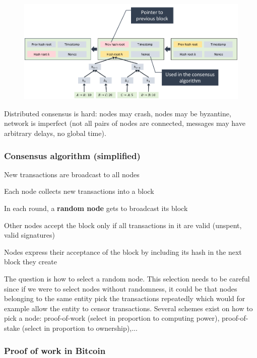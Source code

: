 \documentclass[11pt,oneside,a4paper]{article}
\begin{document}
\begin{figure}[t!]
	\centering
	\includegraphics[width=0.6\linewidth]{figures/bitcoin_blocks}
	\label{fig:bitcoinblocks}
\end{figure}

Distributed consensus is hard: nodes may crash, nodes may be byzantine, network is imperfect (not all pairs of nodes are connected, messages may have arbitrary delays, no global time).\\

\subsubsection{Consensus algorithm (simplified)}

\begin{compactenum}
	\item New transactions are broadcast to all nodes
	\item Each node collects new transactions into a block
	\item In each round, a \textbf{random node} gets to broadcast its block
	\item Other nodes accept the block only if all transactions in it are valid (unspent, valid signatures)
	\item Nodes express their acceptance of the block by including its hash in the next block they create\\
\end{compactenum}

The question is how to select a random node. This selection needs to be careful since if we were to select nodes without randomness, it could be that nodes belonging to the same entity pick the transactions repeatedly which would for example allow the entity to censor transactions. Several schemes exist on how to pick a node: proof-of-work (select in proportion to computing power), proof-of-stake (select in proportion to ownership),... 

\subsubsection{Proof of work in Bitcoin}
\end{document}
